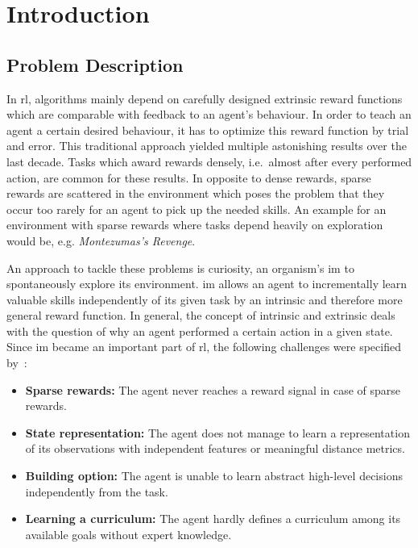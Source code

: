 \documentclass[draft,final]{vutinfth} %
\newcommand{\p}[1]{see p. #1}
\begin{document}

    \tableofcontents %

    \mainmatter


    \chapter{Introduction}


    \section{Problem Description}\label{sec:problem-description}
    In \gls{rl}, algorithms mainly depend on carefully designed extrinsic reward functions which are comparable with feedback to an agent's behaviour.
    In order to teach an agent a certain desired behaviour, it has to optimize this reward function by trial and error.
    This traditional approach yielded multiple astonishing results over the last decade.
    Tasks which award rewards densely, i.e.\ almost after every performed action, are common for these results.
    In opposite to dense rewards, sparse rewards are scattered in the environment which poses the problem that they occur too rarely for an agent to pick up the needed skills.
    An example for an environment with sparse rewards where tasks depend heavily on exploration would be, e.g. \textit{Montezumas's Revenge}.

    An approach to tackle these problems is curiosity, an organism's \gls{im} to spontaneously explore its environment.
    \gls{im} allows an agent to incrementally learn valuable skills independently of its given task by an intrinsic and therefore more general reward function.
    In general, the concept of intrinsic and extrinsic deals with the question of why an agent performed a certain action in a given state.
    Since \gls{im} became an important part of \gls{rl}, the following challenges were specified by~\cite[\p{6}]{aubret_survey_2019}:

    \begin{itemize}
        \item \textbf{Sparse rewards:} The agent never reaches a reward signal in case of sparse rewards.
        \item \textbf{State representation:} The agent does not manage to learn a representation of its observations with independent features or meaningful distance metrics.
        \item \textbf{Building option:} The agent is unable to learn abstract high-level decisions independently from the task.
        \item \textbf{Learning a curriculum:} The agent hardly defines a curriculum among its available goals without expert knowledge.
        \label{enm:challenges}
    \end{itemize}
\end{document}

